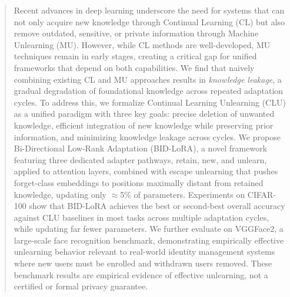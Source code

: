 \begin{abstract}
\label{abstract}
Recent advances in deep learning underscore the need for systems that can not only acquire new knowledge through Continual Learning (CL) but also remove outdated, sensitive, or private information through Machine Unlearning (MU). However, while CL methods are well-developed, MU techniques remain in early stages, creating a critical gap for unified frameworks that depend on both capabilities. We find that naively combining existing CL and MU approaches results in \textit{knowledge leakage}, a gradual degradation of foundational knowledge across repeated adaptation cycles. To address this, we formalize Continual Learning Unlearning (CLU) as a unified paradigm with three key goals: precise deletion of unwanted knowledge, efficient integration of new knowledge while preserving prior information, and minimizing knowledge leakage across cycles. We propose Bi-Directional Low-Rank Adaptation (BID-LoRA), a novel framework featuring three dedicated adapter pathways, retain, new, and unlearn, applied to attention layers, combined with escape unlearning that pushes forget-class embeddings to positions maximally distant from retained knowledge, updating only $\approx$5\% of parameters. Experiments on CIFAR-100 show that BID-LoRA achieves the best or second-best overall accuracy against CLU baselines in most tasks across multiple adaptation cycles, while updating far fewer parameters. We further evaluate on VGGFace2, a large-scale face recognition benchmark, demonstrating empirically effective unlearning behavior relevant to real-world identity management systems where new users must be enrolled and withdrawn users removed. These benchmark results are empirical evidence of effective unlearning, not a certified or formal privacy guarantee.
\end{abstract}

